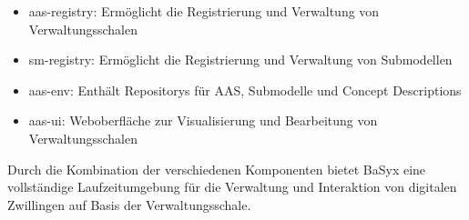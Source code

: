 \begin{itemize}
    \item aas-registry: Ermöglicht die Registrierung und Verwaltung von Verwaltungsschalen
    \item sm-registry: Ermöglicht die Registrierung und Verwaltung von Submodellen
    \item aas-env: Enthält Repositorys für AAS, Submodelle und Concept Descriptions
    \item aas-ui: Weboberfläche zur Visualisierung und Bearbeitung von Verwaltungsschalen
\end{itemize}

Durch die Kombination der verschiedenen Komponenten bietet BaSyx eine vollständige Laufzeitumgebung für die Verwaltung und Interaktion von digitalen Zwillingen auf Basis der Verwaltungsschale.



